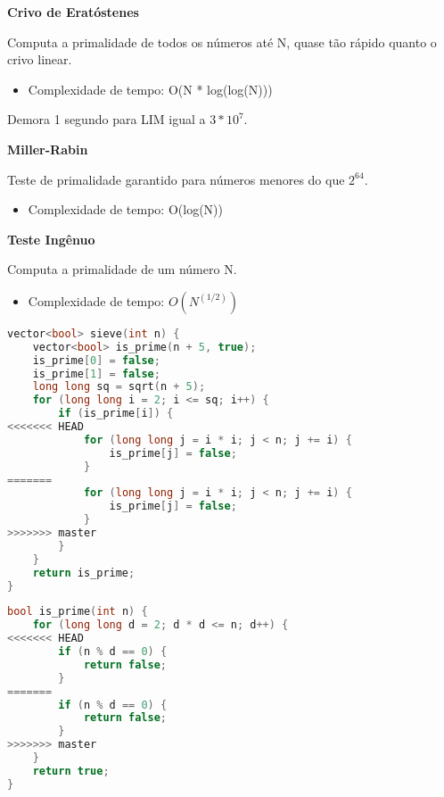 \documentclass[11pt, a4paper, oneside]{book}
\begin{document}
\textbf{Crivo de Eratóstenes} 

Computa a primalidade de todos os números até N, quase tão rápido quanto o crivo linear.



\begin{itemize}
\item Complexidade de tempo: O(N * log(log(N)))
\end{itemize}



Demora 1 segundo para LIM igual a $3 * 10^7$.



\textbf{Miller-Rabin} 

Teste de primalidade garantido para números menores do que $2^64$.



\begin{itemize}
\item Complexidade de tempo: O(log(N))
\end{itemize}



\textbf{Teste Ingênuo} 

Computa a primalidade de um número N.



\begin{itemize}
\item Complexidade de tempo: $O(N^(1/2))$
\end{itemize}

\hfill

\begin{multicols}{2}
\begin{lstlisting}[language=C++]
vector<bool> sieve(int n) {
    vector<bool> is_prime(n + 5, true);
    is_prime[0] = false;
    is_prime[1] = false;
    long long sq = sqrt(n + 5);
    for (long long i = 2; i <= sq; i++) {
        if (is_prime[i]) {
<<<<<<< HEAD
            for (long long j = i * i; j < n; j += i) {
                is_prime[j] = false;
            }
=======
            for (long long j = i * i; j < n; j += i) {
                is_prime[j] = false;
            }
>>>>>>> master
        }
    }
    return is_prime;
}
\end{lstlisting}
\end{multicols}

\hfill

\begin{multicols}{2}
\begin{lstlisting}[language=C++]
bool is_prime(int n) {
    for (long long d = 2; d * d <= n; d++) {
<<<<<<< HEAD
        if (n % d == 0) {
            return false;
        }
=======
        if (n % d == 0) {
            return false;
        }
>>>>>>> master
    }
    return true;
}
\end{lstlisting}
\end{multicols}
\end{document}
